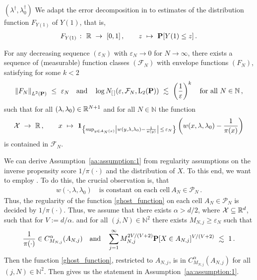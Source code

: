 $
(\lambda^\dagger,\lambda_0^\dagger)
$
We adapt the error decomposition in \cite[page 27]{Wang2019} 
to estimates of the distribution function $F_{Y(1)}$ of $Y(1)$, 
that is,
\begin{gather}
  F_{Y(1)}
  \ 
  \colon
  \ 
  \R
  \ 
  \to
  \ 
  [0,1]
  \, 
  , 
  \qquad
  z
  \ 
  \mapsto
  \ 
  \P
  [
  Y(1)
  \le
  z
  ]
  \,.
\end{gather}
\begin{assumption}
  \label{aa:assumption:1}
  For any decreasing sequence
  $(\varepsilon_N)$ with $\varepsilon_N\to 0$ for $N\to\infty$,
there exists a sequence of (measurable) function classes
$(\mathcal{F}_N)$
with envelope functions
$(F_N)$,
satisfying 
for some $k<2$
\begin{gather*}
\norm{F_N}_{L^2(\P)}
\ 
\le
\ 
\varepsilon_N
\quad
\text{and}
\quad
  \log
  N_{[\,]}(\varepsilon,\mathcal{F}_N,\mathrm{L}_2(\P))
  \ 
  \lesssim
  \ 
  \left( 
  \frac{1}{\varepsilon}
  \right)^k
  \quad
  \text{for all}
  \ 
  N\in\mathbb{N}
  \,,
\end{gather*}
such that for all $(\lambda,\lambda_0)\in\mathbb{R}^{N+1}$ and for all $N\in\mathbb{N}$ the function
\begin{gather}
  \label{ghost_function}
  \mathcal{X}
  \ 
  \to
  \ 
  \R
  \,,
  \qquad
  x
  \ 
  \mapsto
  \ 
  \mathbf{1}_{
    \left\{ 
      \sup_{y\in A_N(x)}
      \left| 
      w(y,\lambda,\lambda_0)
      -
      \frac{1}{\pi(y)}
      \right|
      \,
      \le
      \,
      \varepsilon_N
    \right\}
  }
  \left( 
      w(x,\lambda,\lambda_0)
      -
      \frac{1}{\pi(x)}
  \right)
\end{gather}
is contained in $\mathcal{F}_N$.
\end{assumption}
\begin{remark}
  We can derive Assumption~\ref{aa:assumption:1} from regularity assumptions on the inverse propensity score 
  $1/\pi(\cdot)$ and the distribution of $X$.
  To this end, we want to employ \cite[Corollary~2.7.4]{vaart2013}.
  To do this, the crucial observation is, that
  \begin{gather*}
    w(\cdot,\lambda,\lambda_0)
    \quad
    \text{is constant on each cell}\ 
    A_N\in\mathcal{P}_N
    \,.
  \end{gather*}
  Thus, the regularity of the function \eqref{ghost_function}
  on each cell $A_N\in\mathcal{P}_N$ is decided by 
  $1/\pi(\cdot)$.
  Thus, we assume that there exists
  $\alpha>d/2$, where $\mathcal{X}\subseteq \mathbb{R}^d$, such
  that for 
  $V:=d/\alpha$.
 and for all 
$
(j,N)\in\mathbb{N}^2
$
there exists 
$M_{N,j}\ge \varepsilon_N$ such that 
\begin{gather*}
  \frac{1}{\pi(\cdot)}
  \in C^\alpha_{M_{N,j}}(A_{N,j})
  \quad
  \text{and}
  \quad
  \sum_{j=1}^{\infty} 
  M_{N,j}^{2V/(V+2)}
  \P
  [
  X\in A_{N,j}
  ]^{V/(V+2)}
  \ 
  \lesssim
  \ 
  1
  \,.
\end{gather*}
Then the function \ref{ghost_function}, restricted to $A_{N,j}$, is in 
$
  C^\alpha_{M_{N,j}}(A_{N,j})
$
for all 
$
(j,N)\in\mathbb{N}^2
$.
Then \cite[Corollary~2.7.4]{vaart2013} gives us the statement 
in
Assumption~\ref{aa:assumption:1}.
\end{remark}
